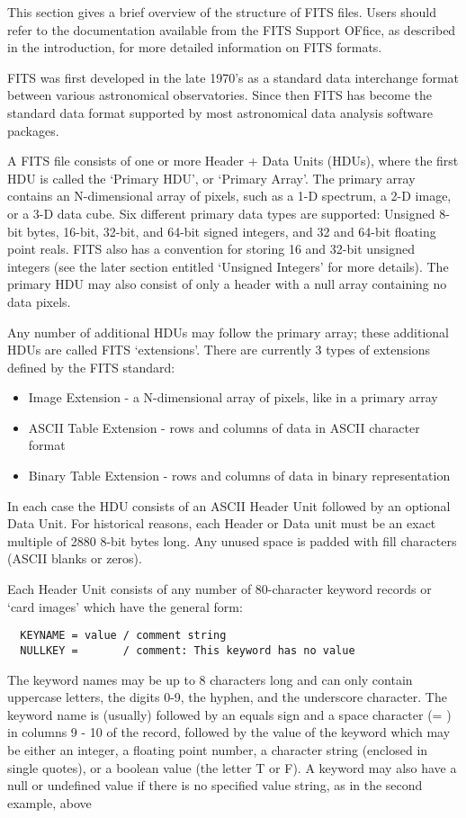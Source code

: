 \documentclass[11pt]{book}
\begin{document}
This section gives a brief overview of the structure of FITS files.
Users should refer to the documentation available from the FITS Support OFfice,
as described in the introduction, for more detailed information on FITS
formats.

FITS was first developed in the late 1970's as a standard data
interchange format between various astronomical observatories.  Since
then FITS has become the standard data format supported by most
astronomical data analysis software packages.

A FITS file consists of one or more Header + Data Units (HDUs), where
the first HDU is called the `Primary HDU', or `Primary Array'.  The
primary array contains an N-dimensional array of pixels, such as a 1-D
spectrum, a 2-D image, or a 3-D data cube.  Six different primary
data types are supported: Unsigned 8-bit bytes, 16-bit, 32-bit, and 64-bit signed
integers, and 32 and 64-bit floating point reals.  FITS also has a
convention for storing 16 and 32-bit unsigned integers (see the later
section entitled `Unsigned Integers' for more details). The primary HDU
may also consist of only a header with a null array containing no
data pixels.

Any number of additional HDUs may follow the primary array; these
additional HDUs are called FITS `extensions'.  There are currently 3
types of extensions defined by the FITS standard:

\begin{itemize}
\item
  Image Extension - a N-dimensional array of pixels, like in a primary array
\item
  ASCII Table Extension - rows and columns of data in ASCII character format
\item
  Binary Table Extension - rows and columns of data in binary representation
\end{itemize}

In each case the HDU consists of an ASCII Header Unit followed by an optional
Data Unit.  For historical reasons, each Header or Data unit must be an
exact multiple of 2880 8-bit bytes long.  Any unused space is padded
with fill characters (ASCII blanks or zeros).

Each Header Unit consists of any number of 80-character keyword records
or `card images' which have the
general form:

\begin{verbatim}
  KEYNAME = value / comment string
  NULLKEY =       / comment: This keyword has no value
\end{verbatim}
The keyword names may be up to 8 characters long and can only contain
uppercase letters, the digits 0-9, the hyphen, and the underscore
character. The keyword name is (usually) followed by an equals sign and
a space character (= ) in columns 9 - 10 of the record, followed by the
value of the keyword which may be either an integer, a floating point
number, a character string (enclosed in single quotes), or a boolean
value (the letter T or F).   A keyword may also have a null or undefined
value if there is no specified value string, as in the second example, above
\end{document}

